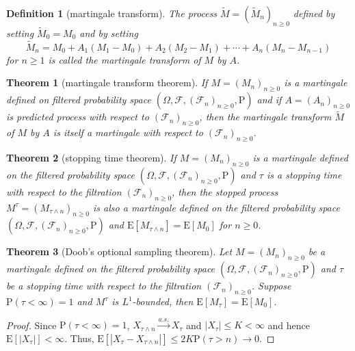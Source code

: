 \documentclass{article}
\newtheorem{definition}{Definition}[section]
\newtheorem{theorem}{Theorem}[section]
\theoremstyle{nonumberplain}
\newtheorem{proof}{Proof.}
\begin{document}
\begin{definition}[martingale transform]
The process $\widetilde{M}=(\widetilde{M}_{n})_{n\ge0}$ defined by setting $\widetilde{M}_{0}=M_{0}$ and by setting
\[
\widetilde{M}_{n}=M_{0}+A_{1}\left(M_{1}-M_{0}\right)+A_{2}\left(M_{2}-M_{1}\right)+\cdots+A_{n}\left(M_{n}-M_{n-1}\right)
\]
for $n \geq 1$ is called the martingale transform of $M$ by $A$.
\end{definition}

\begin{theorem}[martingale transform theorem]
If $M=(M_{n})_{n\ge0}$ is a martingale defined on filtered probability space $(\Omega,\mathcal{F},(\mathcal{F}_{n})_{n\ge0},\mathrm{P})$ and if $A=(A_{n})_{n\ge0}$ is predicted process with respect to $(\mathcal{F}_{n})_{n\ge0}$, then the martingale transform $\widetilde{M}$ of $M$ by $A$ is itself a martingale with respect to $(\mathcal{F}_{n})_{n\ge0}$.
\end{theorem}

\begin{theorem}[stopping time theorem]
If $M=(M_{n})_{n\ge0}$ is a martingale defined on the filtered probability space $(\Omega,\mathcal{F},(\mathcal{F}_{n})_{n\ge0},\mathrm{P})$ and $\tau$ is a stopping time with respect to the filtration $(\mathcal{F}_{n})_{n\ge 0}$, then the stopped process $M^\tau=(M_{\tau\wedge{n}})_{n\ge0}$ is also a martingale defined on the filtered probability space $(\Omega,\mathcal{F},(\mathcal{F}_{n})_{n\ge0},\mathrm{P})$ and $\mathrm{E}[M_{\tau\wedge{n}}]=\mathrm{E}[M_0]$ for $n\ge0$.
\end{theorem}

\begin{theorem}[Doob's optional sampling theorem]
Let $M=(M_{n})_{n\ge0}$ be a martingale defined on the filtered probability space $(\Omega,\mathcal{F},(\mathcal{F}_{n})_{n\ge0},\mathrm{P})$ and $\tau$ be a stopping time with respect to the filtration $(\mathcal{F}_{n})_{n\ge 0}$. Suppose $\mathrm{P}(\tau<\infty)=1$ and $M^\tau$ is $L^1$-bounded, then $\mathrm{E}[M_\tau]=\mathrm{E}[M_{0}]$.
\end{theorem}
\begin{proof}	
Since $\mathrm{P}(\tau<\infty)=1$, $X_{\tau \wedge n} \stackrel{a.s.}{\longrightarrow}X_{\tau}$ and $\left|X_{\tau}\right| \leq K<\infty$ and hence $\mathrm{E}\left[\left|X_{\tau}\right|\right]<\infty .$ Thus, $\mathrm{E}\left[\left|X_{\tau}-X_{\tau \wedge n}\right| \right]\leq 2 K \mathrm{P}(\tau>n) \rightarrow 0$.
\end{proof}
\end{document}
